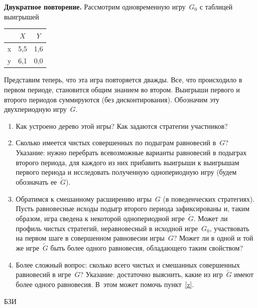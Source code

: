 \begin{problem}
 {\bf Двукратное повторение.} Рассмотрим одновременную
игру~$G_0$ с таблицей выигрышей

\begin{center}
\begin{tabular}{|c|cc|}
\hline &$X$&$Y$\\ \hline x&5,5&1,6\\ y&6,1&0,0\\ \hline
\end{tabular}
\end{center}

Представим теперь, что эта игра повторяется дважды. Все,
что происходило в первом периоде, становится общим знанием
во втором. Выигрыши первого и второго периодов суммируются
(без дисконтирования). Обозначим эту двухпериодную
игру~$G$.

\begin{enumerate}

\item Как устроено дерево этой игры? Как задаются стратегии
участников?

\item Сколько имеется чистых совершенных по подыграм
равновесий в~$G$? Указание: нужно перебрать всевозможные
варианты равновесий в подыграх второго периода, для каждого
из них прибавить выигрыши к выигрышам первого периода и
исследовать полученную однопериодную игру (будем обозначать
ее~$\tilde G$).

\item\label{z} Обратимся к смешанному расширению игры~$G$
(в поведенческих стратегиях). Пусть равновесные исходы
подыгр второго периода зафиксированы и, таким образом, игра
сведена к некоторой однопериодной игре~$\tilde G$. Может ли
профиль чистых стратегий, неравновесный в исходной
игре~$G_0$, участвовать на первом шаге в совершенном
равновесии игры~$G$? Может ли в одной и той же игре~$\tilde
G$ быть более одного равновесия, обладающего таким
свойством?

\item Более сложный вопрос: сколько всего чистых и
смешанных совершенных равновесий в игре~$G$? Указание:
достаточно выяснить, какие из игр~$\tilde G$ имеют более
одного равновесия. В~этом может помочь пункт~\ref{z}.

\end{enumerate}



\begin{source}
БЗИ
\end{source}


\begin{sol}

\end{sol}
\end{problem}



